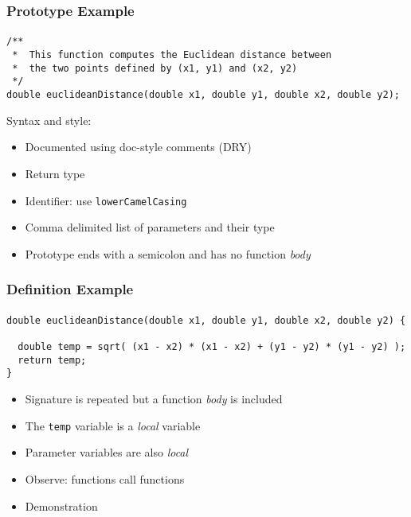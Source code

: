\documentclass[]{beamer}
\begin{document}
\begin{frame}[fragile]
    \frametitle{Prototype Example}
    \framesubtitle{}

\begin{verbatim}
/**
 *  This function computes the Euclidean distance between
 *  the two points defined by (x1, y1) and (x2, y2)
 */
double euclideanDistance(double x1, double y1, double x2, double y2);
\end{verbatim}

Syntax and style:
\begin{itemize}[<+->]
  \item Documented using doc-style comments (DRY)
  \item Return type
  \item Identifier: use \texttt{lowerCamelCasing}
  \item Comma delimited list of parameters and their type
  \item Prototype ends with a semicolon and has no function \emph{body}
\end{itemize}

\end{frame}

\begin{frame}[fragile]
    \frametitle{Definition Example}
    \framesubtitle{}
    
\begin{verbatim}
double euclideanDistance(double x1, double y1, double x2, double y2) {

  double temp = sqrt( (x1 - x2) * (x1 - x2) + (y1 - y2) * (y1 - y2) );
  return temp;
}
\end{verbatim}

\begin{itemize}[<+->]
  \item Signature is repeated but a function \emph{body} is included
  \item The \texttt{temp} variable is a \emph{local} variable
  \item Parameter variables are also \emph{local}
  \item Observe: functions call functions

  \item Demonstration
\end{itemize}
\end{frame}
\end{document}
